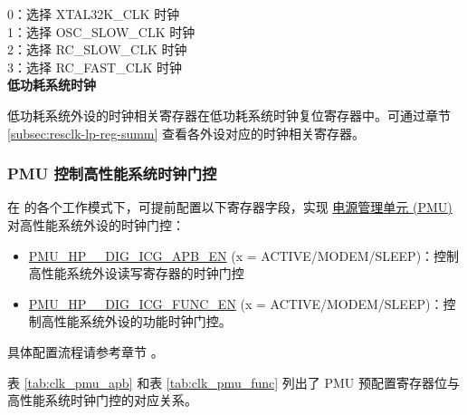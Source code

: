 \documentclass[main\_\_CN.tex]{subfiles}
\begin{document}
0：选择 XTAL32K\_CLK 时钟\\
1：选择 OSC\_SLOW\_CLK 时钟\\
2：选择 RC\_SLOW\_CLK 时钟\\
3：选择 RC\_FAST\_CLK 时钟\\

\textbf{低功耗系统时钟}

低功耗系统外设的时钟相关寄存器在低功耗系统时钟复位寄存器中。可通过章节 \ref{subsec:resclk-lp-reg-summ} \textit{} 查看各外设对应的时钟相关寄存器。




\subsubsection{PMU 控制高性能系统时钟门控}
在 \chipname{} 的各个工作模式下，可提前配置以下寄存器字段，实现 \hyperref[mod:lowpowm]{电源管理单元 (PMU)} 对高性能系统外设的时钟门控：
\begin{itemize}
    \item \hyperref[fielddesc:PMUHPACTIVEDIGICGAPBEN]{PMU\_HP\_\_DIG\_ICG\_APB\_EN} (x = ACTIVE/MODEM/SLEEP)：控制高性能系统外设读写寄存器的时钟门控
    \item \hyperref[fielddesc:PMUHPACTIVEDIGICGFUNCEN]{PMU\_HP\_\_DIG\_ICG\_FUNC\_EN} (x = ACTIVE/MODEM/SLEEP)：控制高性能系统外设的功能时钟门控。
\end{itemize}

具体配置流程请参考章节 。


表 \ref{tab:clk_pmu_apb} 和表 \ref{tab:clk_pmu_func} 列出了 PMU 预配置寄存器位与高性能系统时钟门控的对应关系。
\end{document}
